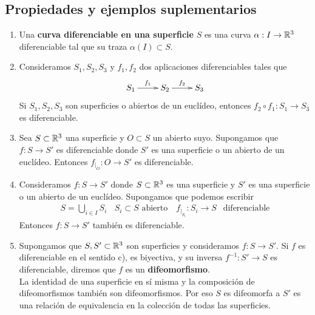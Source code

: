 \subsection{Propiedades y ejemplos suplementarios}
\begin{enumerate}
    \item Una \textbf{curva diferenciable en una superficie} $S$ es una curva $\alpha:I\to \mathbb{R}^3$ diferenciable tal que su traza $\alpha(I)\subset S$. 
    
    \item Consideramos $S_1, S_2, S_3$  y $f_1, f_2$ dos aplicaciones diferenciables tales que 
    \begin{gather*}
        \xymatrix{
            S_1 \ar[r]^{f_1} & S_2 \ar[r]^{f_2} & S_3
        }
    \end{gather*}
    Si $S_1, S_2, S_3$ son superficies o abiertos de un euclídeo, entonces $f_2\circ f_1: S_1 \to S_3$ es diferenciable.

    \item Sea $S\subset \mathbb{R}^3$ una superficie y $O\subset S$ un abierto suyo. Supongamos que $f:S\to S'$ es diferenciable donde $S'$ es una superficie o un abierto de un euclídeo. Entonces $f_{|_O}:O\to S'$ es diferenciable.
    
    \item Consideramos $f:S\to S'$ donde $S\subset \mathbb{R}^3$ es una superficie y $S'$ es una superficie o un abierto de un euclídeo. Supongamos que podemos escribir
    \begin{gather*}
        S=\bigcup\limits_{i\in I} S_i\ \ \ \ S_i\subset S \text{ abierto }\ \ \ f_{|_{S_i}}:S_i\to S\ \ \text{ diferenciable}
    \end{gather*}
    Entonces $f:S\to S'$ también es diferenciable.

    \item Supongamos que $S,S'\subset \mathbb{R}^3$ son superficies y consideramos $f:S\to S'$. Si $f$ es diferenciable en el sentido c), es biyectiva, y su inversa $f^{-1}:S'\to S$ es diferenciable, diremos que $f$ es un \textbf{difeomorfismo}. \\
    
    La identidad de una superficie en sí misma y la composición de difeomorfismos también son difeomorfismos. Por eso $S$ es difeomorfa a $S'$ es una relación de equivalencia en la colección de todas las superficies.
\end{enumerate}

